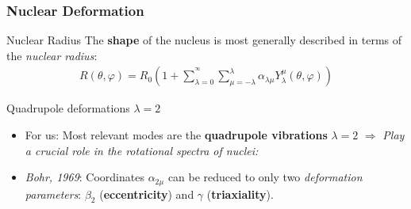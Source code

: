 \documentclass{beamer}
\begin{document}
\begin{frame}
	\frametitle{Nuclear Deformation}
	\begin{exampleblock}{Nuclear Radius}
		The \textbf{shape} of the nucleus is most generally described in terms of the \emph{nuclear radius}:
		\begin{align}
			R(\theta,\varphi)=R_0\left(1+\sum_{\lambda=0}^{^\infty}\sum_{\mu=-\lambda}^\lambda\alpha_{\lambda\mu}Y_\lambda^\mu(\theta,\varphi)\right)
		\end{align}
	\end{exampleblock}
	\begin{block}{Quadrupole deformations $\lambda=2$}

		\begin{itemize}
			\item {\color{red}For us:} Most relevant modes are the \textbf{quadrupole vibrations} $\lambda=2$ $\Longrightarrow$ \emph{Play a crucial role in the rotational spectra of nuclei:}
			\item \textit{Bohr, 1969}: Coordinates $\alpha_{2\mu}$ can be reduced to only two \emph{deformation parameters}: $\beta_2$ (\textbf{eccentricity}) and $\gamma$ (\textbf{triaxiality}).
		\end{itemize}
	\end{block}
\end{frame}
\end{document}
